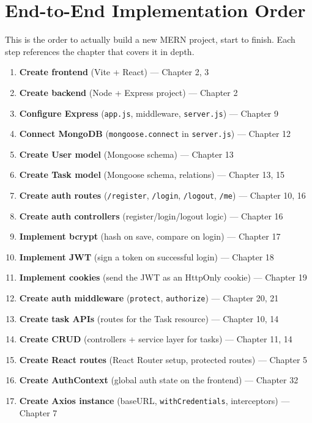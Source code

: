 \chapter{End-to-End Implementation Order}

\begin{notebox}[NOTE]
This is the order to actually build a new MERN project, start to finish.
Each step references the chapter that covers it in depth.
\end{notebox}

\begin{enumerate}
\item \textbf{Create frontend} (Vite + React) --- Chapter 2, 3
\item \textbf{Create backend} (Node + Express project) --- Chapter 2
\item \textbf{Configure Express} (\texttt{app.js}, middleware, \texttt{server.js}) --- Chapter 9
\item \textbf{Connect MongoDB} (\texttt{mongoose.connect} in \texttt{server.js}) --- Chapter 12
\item \textbf{Create User model} (Mongoose schema) --- Chapter 13
\item \textbf{Create Task model} (Mongoose schema, relations) --- Chapter 13, 15
\item \textbf{Create auth routes} (\texttt{/register}, \texttt{/login}, \texttt{/logout}, \texttt{/me}) --- Chapter 10, 16
\item \textbf{Create auth controllers} (register/login/logout logic) --- Chapter 16
\item \textbf{Implement bcrypt} (hash on save, compare on login) --- Chapter 17
\item \textbf{Implement JWT} (sign a token on successful login) --- Chapter 18
\item \textbf{Implement cookies} (send the JWT as an HttpOnly cookie) --- Chapter 19
\item \textbf{Create auth middleware} (\texttt{protect}, \texttt{authorize}) --- Chapter 20, 21
\item \textbf{Create task APIs} (routes for the Task resource) --- Chapter 10, 14
\item \textbf{Create CRUD} (controllers + service layer for tasks) --- Chapter 11, 14
\item \textbf{Create React routes} (React Router setup, protected routes) --- Chapter 5
\item \textbf{Create AuthContext} (global auth state on the frontend) --- Chapter 32
\item \textbf{Create Axios instance} (baseURL, \texttt{withCredentials}, interceptors) --- Chapter 7

\end{enumerate}
